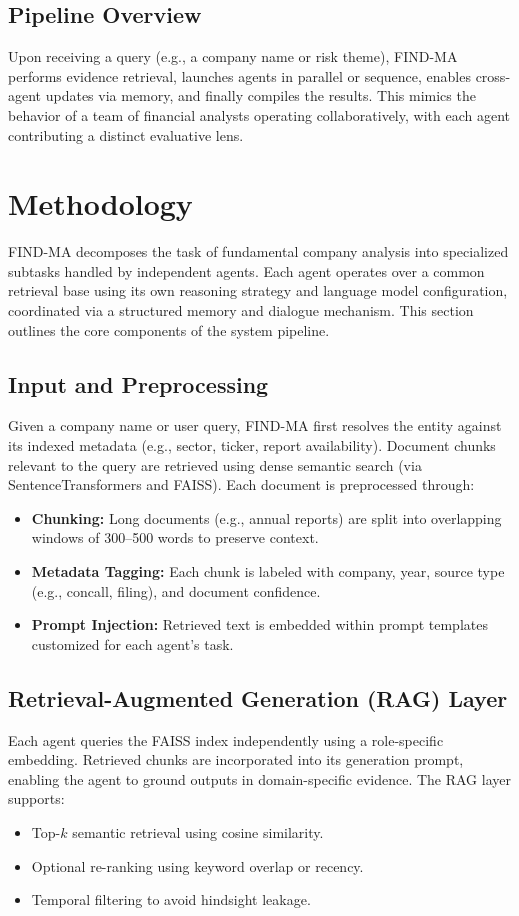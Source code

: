 \documentclass[11pt]{article}
\newcommand{\findma}{\textsc{FIND-MA}}
\begin{document}
\subsection*{Pipeline Overview}
Upon receiving a query (e.g., a company name or risk theme), \findma{} performs evidence retrieval, launches agents in parallel or sequence, enables cross-agent updates via memory, and finally compiles the results. This mimics the behavior of a team of financial analysts operating collaboratively, with each agent contributing a distinct evaluative lens.

\section{Methodology}
\label{sec:methodology}
\findma{} decomposes the task of fundamental company analysis into specialized subtasks handled by independent agents. Each agent operates over a common retrieval base using its own reasoning strategy and language model configuration, coordinated via a structured memory and dialogue mechanism. This section outlines the core components of the system pipeline.

\subsection*{Input and Preprocessing}
Given a company name or user query, \findma{} first resolves the entity against its indexed metadata (e.g., sector, ticker, report availability). Document chunks relevant to the query are retrieved using dense semantic search (via SentenceTransformers and FAISS). Each document is preprocessed through:
\begin{itemize}
    \item \textbf{Chunking:} Long documents (e.g., annual reports) are split into overlapping windows of 300–500 words to preserve context.
    \item \textbf{Metadata Tagging:} Each chunk is labeled with company, year, source type (e.g., concall, filing), and document confidence.
    \item \textbf{Prompt Injection:} Retrieved text is embedded within prompt templates customized for each agent’s task.
\end{itemize}

\subsection*{Retrieval-Augmented Generation (RAG) Layer}
Each agent queries the FAISS index independently using a role-specific embedding. Retrieved chunks are incorporated into its generation prompt, enabling the agent to ground outputs in domain-specific evidence. The RAG layer supports:
\begin{itemize}
    \item Top-$k$ semantic retrieval using cosine similarity.
    \item Optional re-ranking using keyword overlap or recency.
    \item Temporal filtering to avoid hindsight leakage.
\end{itemize}
\end{document}
